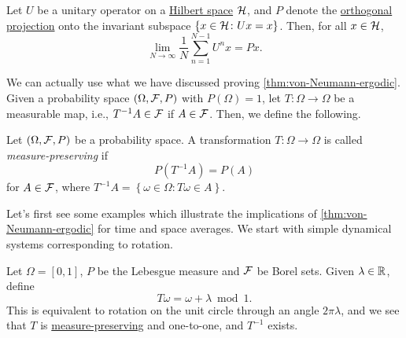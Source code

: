 \begin{theorem}\label{thm:von-Neumann-ergodic}
	Let \(U\) be a unitary operator on a \hyperref[def:Hilbert-space]{Hilbert space} \(\mathcal{\MakeUppercase{h}} \), and \(P\) denote the \hyperref[def:orthogonal-projection]{orthogonal projection} onto the invariant subspace \(\left\{ x\in \mathcal{\MakeUppercase{h}} \colon Ux = x \right\} \). Then, for all \(x\in \mathcal{\MakeUppercase{h}} \),
	\[
		\lim\limits_{N \to \infty} \frac{1}{N}\sum\limits_{n=1}^{N-1} U^n x = Px.
	\]
\end{theorem}

We can actually use what we have discussed proving \autoref{thm:von-Neumann-ergodic}. Given a probability space \((\Omega , \mathcal{\MakeUppercase{f}} , P)\) with \(P(\Omega ) = 1\), let \(T\colon \Omega \to \Omega \) be a measurable map, i.e., \(T^{-1} A \in \mathcal{\MakeUppercase{f}} \) if \(A\in \mathcal{\MakeUppercase{f}} \). Then, we define the following.

\begin{definition}\label{def:measure-preserving}
	Let \((\Omega , \mathcal{\MakeUppercase{f}} , P)\) be a probability space. A transformation \(T\colon \Omega \to \Omega \) is called \emph{measure-preserving} if
	\[
		P(T^{-1} A) = P(A)
	\]
	for \(A\in \mathcal{\MakeUppercase{f}} \), where \(T^{-1} A = \left\{ \omega \in \Omega \colon T \omega \in A \right\} \).
\end{definition}

Let's first see some examples which illustrate the implications of \autoref{thm:von-Neumann-ergodic} for time and space averages. We start with simple dynamical systems corresponding to rotation.

\begin{eg}
	Let \(\Omega =[0, 1]\), \(P\) be the Lebesgue measure and \(\mathcal{\MakeUppercase{f}} \) be Borel sets. Given \(\lambda \in \mathbb{\MakeUppercase{r}} \), define
	\[
		T \omega = \omega + \lambda \bmod 1.
	\]
	This is equivalent to rotation on the unit circle through an angle \(2\pi \lambda \), and we see that \(T\) is \hyperref[def:measure-preserving]{measure-preserving} and one-to-one, and \(T^{-1} \) exists.
\end{eg}

